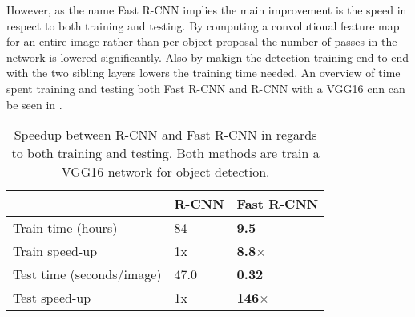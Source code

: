 However, as the name Fast R-CNN implies the main improvement is the speed in respect to both training and testing. By computing a convolutional feature map for an entire image rather than per object proposal the number of passes in the network is lowered significantly. Also by makign the detection training end-to-end with the two sibling layers lowers the training time needed. An overview of time spent training and testing both Fast R-CNN and R-CNN with a VGG16 \gls{cnn} can be seen in .

\begin{table}[]
\centering
\caption{Speedup between R-CNN and Fast R-CNN in regards to both training and testing. Both methods are train a VGG16 network for object detection.}
\label{tab:fastspeed}
\begin{tabular}{|l|l|l|}
\hline
                          & R-CNN & Fast R-CNN \\ \hline
Train time (hours)        & 84    & \textbf{9.5}        \\ 
Train speed-up             & 1x    & \textbf{8.8$\times$}       \\ \hline
Test time (seconds/image) & 47.0  & \textbf{0.32}       \\ 
Test speed-up              & 1x    & \textbf{146$\times$}       \\ \hline
\end{tabular}
\end{table}

